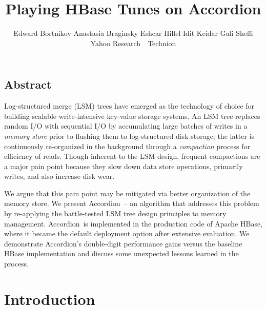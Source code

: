 \documentclass{vldb}
\newcommand{\remove}[1]{}
\newcommand{\tb}{\hspace{5mm}}
\newcommand{\sys}{Accordion}
\begin{document}
\date{}

\title{\Large \bf  Playing HBase Tunes on \sys}


\author{
Edward Bortnikov\footnotemark[1]  \tb
Anastasia Braginsky\footnotemark[1]  \tb
Eshcar Hillel\footnotemark[1] \tb 
Idit Keidar\footnotemark[1] \footnotemark[2] \tb
Gali Sheffi\footnotemark[1] \\
	\footnotemark[1] Yahoo Research\ \ \footnotemark[2] Technion  \\ [2mm]
} %

\maketitle




\subsection*{Abstract}

Log-structured merge (LSM) trees have emerged as the technology of choice for building scalable 
write-intensive key-value storage systems. An LSM tree replaces random I/O with sequential 
I/O by accumulating large batches of writes in a \emph{memory store} prior to flushing them to log-structured 
disk storage; the latter is continuously re-organized in the background through a \emph{compaction}
process for efficiency of reads. Though inherent to the LSM design, frequent compactions are a major pain point 
because they slow down data store operations, primarily writes, and also increase disk wear.

We argue that this pain point may be mitigated via better  organization of the memory store.
We present \sys\ -- an algorithm that addresses this problem by re-applying
the battle-tested LSM tree design principles to memory management. 
\sys\ is implemented in the production code of Apache HBase, where it became the default deployment option 
after extensive evaluation. We demonstrate \sys's double-digit performance gains versus 
the baseline HBase implementation and discuss some unexpected lessons learned in the process. 


\section{Introduction} \label{sec:intro}
 
\end{document}
